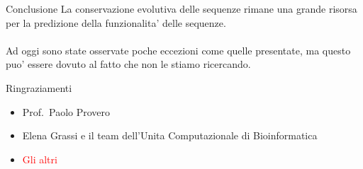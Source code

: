 \documentclass{beamer}
\newcommand{\warn}[1]{\textcolor{red}{#1}}
\begin{document}

    \begin{frame}[plain]{Conclusione}
        La conservazione evolutiva delle sequenze rimane una grande risorsa
        per la predizione della funzionalita' delle sequenze.\\~\\
        Ad oggi sono state osservate poche eccezioni come quelle presentate,
        ma questo puo' essere dovuto al fatto che non le stiamo ricercando.\\
    \end{frame}


    \begin{frame}[plain]{Ringraziamenti}
        \begin{itemize}
            \item Prof.\ Paolo Provero
            \item Elena Grassi e il team dell'Unita Computazionale di Bioinformatica
            \item \warn{Gli altri}
        \end{itemize}
    \end{frame}
\end{document}
